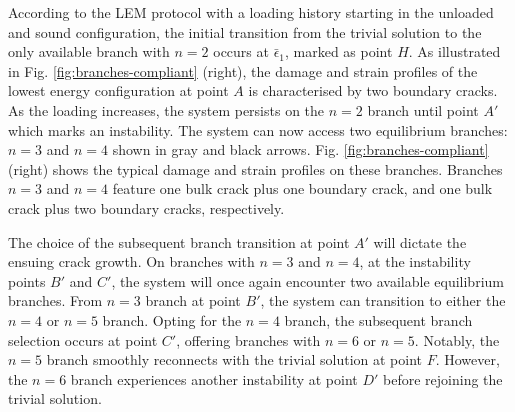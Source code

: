 \documentclass[10pt]{article}
\begin{document}
According to the LEM protocol with a loading history starting in the unloaded and sound configuration, the initial transition from the trivial solution to the only available branch with $n=2$ occurs at $\bar \epsilon_1$, marked as point $H$. As illustrated in Fig. \ref{fig:branches-compliant} (right), the damage and strain profiles of the lowest energy configuration at point $A$ is characterised by two boundary cracks. As the loading increases, the system persists on the $n=2$ branch until point $A'$ which marks an instability. The system can now access two equilibrium branches: $n=3$ and $n=4$ shown in gray and black arrows. Fig. \ref{fig:branches-compliant} (right) shows the typical damage and strain profiles on these branches. Branches $n=3$ and $n=4$ feature one bulk crack plus one boundary crack, and one bulk crack plus two boundary cracks, respectively.

The choice of the subsequent branch transition at point $A'$ will dictate the ensuing crack growth. On branches with $n=3$ and $n=4$, at the instability points $B'$ and $C'$, the system will once again encounter two available equilibrium branches. From $n=3$ branch  at point $B'$, the system can transition to either the $n=4$ or $n=5$ branch. Opting for the $n=4$ branch, the subsequent branch selection occurs at point $C'$, offering branches with $n=6$ or $n=5$. Notably, the $n=5$ branch smoothly reconnects with the trivial solution at point $F$. However, the $n=6$ branch experiences another instability at point $D'$ before rejoining the trivial solution.
\end{document}
